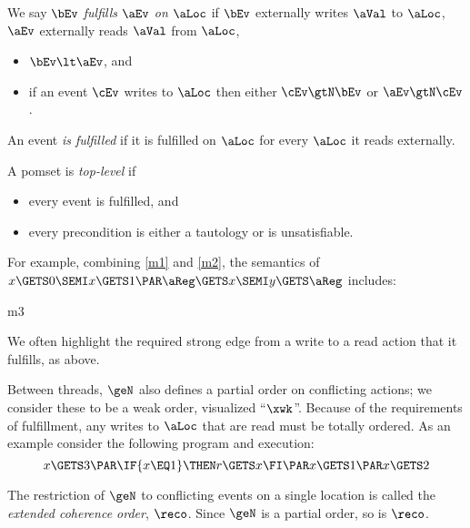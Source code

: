 \begin{definition}
  \label{def:rf}
  We say $\bEv$ \emph{fulfills $\aEv$ on $\aLoc$} if $\bEv$ externally writes
  $\aVal$ to $\aLoc$, $\aEv$ externally reads $\aVal$ from $\aLoc$,
  \begin{itemize}
  \item $\bEv \lt \aEv$, and
  \item if an event $\cEv$ writes to $\aLoc$ then either $\cEv \gtN \bEv$ or $\aEv \gtN \cEv$.
  \end{itemize}

  An event \emph{is fulfilled} if it is fulfilled on $\aLoc$ for every
  $\aLoc$ it reads externally.

  A pomset is \emph{top-level} if
  \begin{itemize}
  \item every event is fulfilled, and
  \item every precondition is either a tautology or is unsatisfiable.
  \end{itemize}
\end{definition}

For example, combining \eqref{m1} and \eqref{m2}, the semantics of
\begin{math}
  x\GETS 0\SEMI
  x\GETS 1
  \PAR
  \aReg\GETS x\SEMI
  y\GETS \aReg
\end{math}
includes:
\begin{tikzdisplaylabel}[node distance=1em]{m3}
\end{tikzdisplaylabel}
We often highlight the required strong edge from a write to a read action that it
fulfills, as above.

Between threads, $\geN$ also defines a partial order on conflicting actions;
we consider these to be a weak order, visualized ``$\xwk$''.
Because of the requirements of fulfillment, any writes to $\aLoc$ that are
read must be totally ordered.  As an example consider the following program
and execution:
\begin{displaymath}
  x\GETS 3
  \PAR
  \IF{x\EQ1}\THEN r\GETS x \FI
  \PAR
  x\GETS 1
  \PAR
  x\GETS2
\end{displaymath}
\begin{tikzdisplay}[node distance=1em]
\end{tikzdisplay}
The restriction of $\geN$ to conflicting events on a single location is called the \emph{extended coherence order}, $\reco$.  Since $\geN$ is a partial order, so is $\reco$.  

